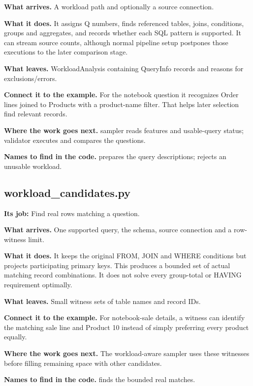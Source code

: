 \textbf{What arrives.} A workload path and optionally a source connection.

\textbf{What it does.} It assigns Q numbers, finds referenced tables, joins, conditions, groups and aggregates, and records whether each SQL pattern is supported. It can stream source counts, although normal pipeline setup postpones those executions to the later comparison stage.

\textbf{What leaves.} WorkloadAnalysis containing QueryInfo records and reasons for exclusions/errors.

\textbf{Connect it to the example.} For the notebook question it recognizes Order lines joined to Products with a product-name filter. That helps later selection find relevant records.

\textbf{Where the work goes next.} sampler reads features and usable-query status; validator executes and compares the questions.

\textbf{Names to find in the code.}  prepares the query descriptions;  rejects an unusable workload.


\subsection{workload\_candidates.py}

\textbf{Its job:} Find real rows matching a question.

\textbf{What arrives.} One supported query, the schema, source connection and a row-witness limit.

\textbf{What it does.} It keeps the original FROM, JOIN and WHERE conditions but projects participating primary keys. This produces a bounded set of actual matching record combinations. It does not solve every group-total or HAVING requirement optimally.

\textbf{What leaves.} Small witness sets of table names and record IDs.

\textbf{Connect it to the example.} For notebook-sale details, a witness can identify the matching sale line and Product 10 instead of simply preferring every product equally.

\textbf{Where the work goes next.} The workload-aware sampler uses these witnesses before filling remaining space with other candidates.

\textbf{Names to find in the code.}  finds the bounded real matches.

